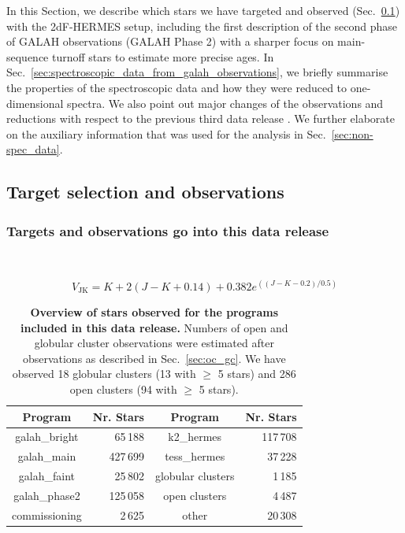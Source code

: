 \documentclass[
  journal=pasa,
  manuscript=research-paper, %
  year=2023,
  volume=37
]{cup-journal}
\begin{document}
In this Section, we describe which stars we have targeted and observed (Sec.~\ref{sec:target_selection_observations}) with the 2dF-HERMES setup, including the first description of the second phase of GALAH observations (GALAH Phase 2) with a sharper focus on main-sequence turnoff stars to estimate more precise ages. In Sec.~\ref{sec:spectroscopic_data_from_galah_observations}, we briefly summarise the properties of the spectroscopic data and how they were reduced to one-dimensional spectra. We also point out major changes of the observations and reductions with respect to the previous third data release \citep{Buder2021}. We further elaborate on the auxiliary information that was used for the analysis in Sec.~\ref{sec:non-spec_data}.

\subsection{Target selection and observations} \label{sec:target_selection_observations}

\subsubsection{Targets and observations go into this data release} $\,$

\begin{equation}
V_\mathrm{JK} = K+2(J-K+0.14)+0.382e^{((J-K-0.2)/0.5)}
\end{equation}

\begin{table}
\centering
 \caption{\textbf{Overview of stars observed for the programs included in this data release.} Numbers of open and globular cluster observations were estimated after observations as described in Sec.~\ref{sec:oc_gc}. We have observed 18 globular clusters (13 with $\geq$ 5 stars) and 286 open clusters (94 with $\geq$ 5 stars).}
\label{tab:field_ids}
\begin{tabular}{crcr}
\hline \hline
Program & Nr. Stars & Program & Nr. Stars \\
\hline
galah\_bright & 65\,188 & 
k2\_hermes & 117\,708\\
galah\_main & 427\,699 & 
tess\_hermes & 37\,228\\
galah\_faint & 25\,802 & 
globular clusters & 1\,185\\
galah\_phase2 & 125\,058 & 
open clusters & 4\,487\\
commissioning & 2\,625 & 
other & 20\,308\\
  \hline
 \end{tabular}
\end{table}
\end{document}
